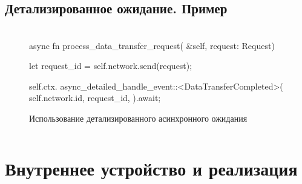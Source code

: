 \documentclass[t]{beamer}  %
\begin{document}
 \subsection{Детализированное ожидание. Пример}

 \begin{frame}[fragile]
	\frametitle{\insertsection} 
	\framesubtitle{\insertsubsection}

	\begin{columns}
		\begin{column}{1.1\linewidth}
			\begin{figure}[H]
				\footnotesize
			\begin{rustcode}
async fn process_data_transfer_request(
	&self, request: Request) {
  let request_id = self.network.send(request);
  
  self.ctx.
   async_detailed_handle_event::<DataTransferCompleted>(
    self.network.id, 
    request_id,
  ).await;
}
			\end{rustcode}
			\caption*{Использование детализированного асинхронного ожидания}
			\end{figure}
		\end{column}
	\end{columns}

 \end{frame}

 \section{Внутреннее устройство и реализация}
\end{document}
